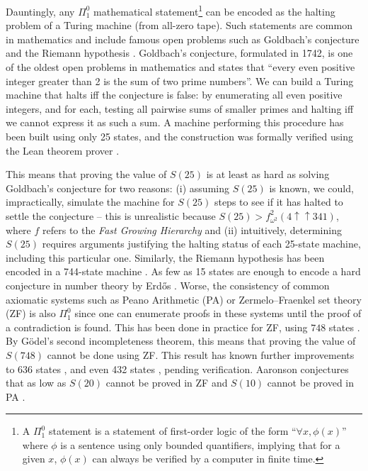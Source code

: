 \documentclass[a4paper,british]{article}
\theoremstyle{definition} %
\numberwithin{equation}{section}
\theoremstyle{definition} %
\begin{document}
Dauntingly, any $\Pi_1^0$ mathematical statement\footnote{A $\Pi_1^0$ statement is a statement of first-order logic of the form ``$\forall x, \phi(x)$'' where $\phi$ is a sentence using only bounded quantifiers, implying that for a given $x$, $\phi(x)$ can always be verified by a computer in finite time.} can be encoded as the halting problem of a Turing machine (from all-zero tape). Such statements are common in mathematics and include famous open problems such as Goldbach's conjecture and the Riemann hypothesis \cite{Davis-Matiyasevich-Robinson-1976}. Goldbach's conjecture, formulated in 1742, is one of the oldest open problems in mathematics and states that ``every even positive integer greater than 2 is the sum of two prime numbers''. We can build a Turing machine that halts iff the conjecture is false: by enumerating all even positive integers, and for each, testing all pairwise sums of smaller primes and halting iff we cannot express it as such a sum. A machine performing this procedure has been built using only 25 states, and the construction was formally verified using the Lean theorem prover \cite{GoldbachTM27, GoldbachTM25, DeMouraKongAvigadVanDoornvonRaumer}.


This means that proving the value of $S(25)$ is at least as hard as solving Goldbach's conjecture for two reasons: (i) assuming $S(25)$ is known, we could, impractically, simulate the machine for $S(25)$ steps to see if it has halted to settle the conjecture -- this is unrealistic because $S(25) > f^2_{\omega^2}(4 \uparrow \uparrow 341)$, where $f$ refers to the \textit{Fast Growing Hierarchy} \cite{wikiChampions,wainer1970classification} and (ii) intuitively, determining $S(25)$ requires arguments justifying the halting status of each 25-state machine, including this particular one. Similarly, the Riemann hypothesis has been encoded in a 744-state machine \cite{RiemannTM,Yedidia2016,BusyBeaverFrontier}. As few as 15 states are enough to encode a hard conjecture in number theory by Erd\H{o}s \cite{BB15}. Worse, the consistency of common axiomatic systems such as Peano Arithmetic (PA) or Zermelo–Fraenkel set theory (ZF) is also $\Pi_1^0$ since one can enumerate proofs in these systems until the proof of a contradiction is found. This has been done in practice for ZF, using $748$ states \cite{BB748Thesis,Yedidia2016,BusyBeaverFrontier}. By G\"odel's second incompleteness theorem, this means that proving the value of $S(748)$ cannot be done using ZF. This result has known further improvements to 636 states \cite{RidenourZF636}, and even 432 states \cite{wade2025alignment}, pending verification. Aaronson conjectures that as low as $S(20)$ cannot be proved in ZF and $S(10)$ cannot be proved in PA \cite{BusyBeaverFrontier}.
\end{document}
